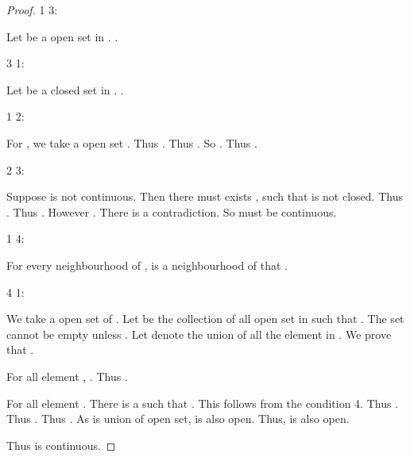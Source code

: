 \begin{proof}

      \hspace{1em}

      1 \mt{\Rightarrow} 3:

      Let  be a open set in . .
      
      \vspace{1em}

      3 \mt{\Rightarrow} 1:

      Let  be a closed set in . .

      \vspace{1em}

      1 \mt{\Rightarrow} 2:

      For , we take a open set . Thus . Thus . So . Thus .

      \vspace{1em}

      2 \mt{\Rightarrow} 3:

      Suppose  is not continuous. Then there must exists , such that  is not closed. Thus . Thus . However . There is a contradiction. So  must be continuous.

      \vspace{1em}

      1 \mt{\Rightarrow} 4:

      For every neighbourhood  of ,  is a neighbourhood of  that .

      \vspace{1em}

      4 \mt{\Rightarrow} 1:

      We take a open set  of . Let  be the collection of all open set  in  such that . The set cannot be empty unless . Let  denote the union of all the element in . We prove that .

      For all element , . Thus .

      For all element . There is a  such that . This follows from the condition 4. Thus . Thus . Thus . As  is union of open set,  is also open. Thus,  is also open.
      
      Thus  is continuous.
\end{proof}

